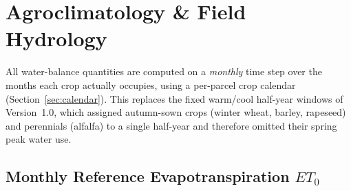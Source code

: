 \section{Agroclimatology \& Field Hydrology}
\label{sec:hydrology}

All water-balance quantities are computed on a \emph{monthly} time step over the months each crop actually occupies, using a per-parcel crop calendar (Section~\ref{sec:calendar}). This replaces the fixed warm/cool half-year windows of Version~1.0, which assigned autumn-sown crops (winter wheat, barley, rapeseed) and perennials (alfalfa) to a single half-year and therefore omitted their spring peak water use.

\subsection{Monthly Reference Evapotranspiration \texorpdfstring{$ET_0$}{ET0}}
\label{sec:et0}
